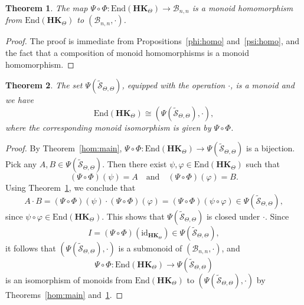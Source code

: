 \documentclass[pdflatex,sn-mathphys-num]{sn-jnl}
\newcommand{\hk}{\mathbf{HK}_{\Theta}}
\newcommand{\vp}{\varphi}
\newcommand{\stt}{\widetilde{\mathcal{S}}_{\Theta,\Theta}}
\newtheorem{theorem}{Theorem}[section]
\theoremstyle{definition}
\theoremstyle{remark}
\begin{document}
\begin{theorem}\label{phi:psi:homo}
   The map $\Psi \circ \Phi : \mathrm{End}(\hk) \to \mathcal{B}_{n, n}$ is a monoid homomorphism from $\mathrm{End}(\hk)$ to $(\mathcal{B}_{n, n}, \cdot)$.
\end{theorem}

\begin{proof}
   The proof is immediate from Propositions~\ref{phi:homo} and~\ref{psi:homo}, and the fact that a composition of monoid homomorphisms is a monoid homomorphism.
\end{proof}

\begin{theorem}\label{endo:main}
   The set $\Psi(\stt)$, equipped with the operation $\cdot$, is a monoid and we have
   \[
   \mathrm{End}(\hk) \cong (\Psi(\stt), \cdot),
   \]
   where the corresponding monoid isomorphism is given by $\Psi \circ \Phi$.
\end{theorem}

\begin{proof}
   By Theorem~\ref{hom:main}, $\Psi \circ \Phi : \mathrm{End}(\hk) \to \Psi(\stt)$ is a bijection.
   Pick any $A, B \in \Psi(\stt)$.
   Then there exist $\psi, \vp \in \mathrm{End}(\hk)$ such that 
   \[
   (\Psi \circ \Phi)(\psi) = A \quad \text{and} \quad (\Psi \circ \Phi)(\vp) = B.
   \]
   Using Theorem~\ref{phi:psi:homo}, we conclude that 
   \[
   A \cdot B = (\Psi \circ \Phi)(\psi) \cdot (\Psi \circ \Phi)(\vp) = (\Psi \circ \Phi)(\psi \circ \vp) \in \Psi(\stt),
   \]
   since $\psi \circ \vp \in \mathrm{End}(\hk)$.
   This shows that $\Psi(\stt)$ is closed under $\cdot$.
   Since
   \[
   I = (\Psi \circ \Phi)(\mathrm{id}_{\hk}) \in \Psi(\stt),
   \]
   it follows that $(\Psi(\stt), \cdot)$ is a submonoid of $(\mathcal{B}_{n, n}, \cdot)$, and
   \[
   \Psi \circ \Phi : \mathrm{End}(\hk) \to \Psi(\stt)
   \]
   is an isomorphism of monoids from $\mathrm{End}(\hk)$ to $(\Psi(\stt), \cdot)$ by Theorems~\ref{hom:main} and~\ref{phi:psi:homo}.
\end{proof}












\end{document}
